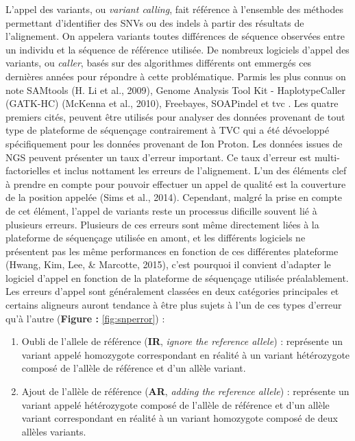 \documentclass[12pt,twoside]{reedthesis}
\providecommand{\tightlist}{%
  \setlength{\itemsep}{0pt}\setlength{\parskip}{0pt}}
\theoremstyle{definition}
\theoremstyle{definition}
\theoremstyle{remark}
\begin{document}
  L'appel des variants, ou \emph{variant calling}, fait référence à
  l'ensemble des méthodes permettant d'identifier des SNVs ou des indels à
  partir des résultats de l'alignement. On appelera variants toutes
  différences de séquence observées entre un individu et la séquence de
  référence utilisée. De nombreux logiciels d'appel des variants, ou
  \emph{caller}, basés sur des algorithmes différents ont emmergés ces
  dernières années pour répondre à cette problématique. Parmis les plus
  connus on note SAMtools (H. Li et al., 2009), Genome Analysis Tool Kit -
  HaplotypeCaller (GATK-HC) (McKenna et al., 2010), Freebayes, SOAPindel
  et tvc . Les quatre premiers cités, peuvent être utilisés pour analyser
  des données provenant de tout type de plateforme de séquençage
  contrairement à TVC qui a été dévoeloppé spécifiquement pour les données
  provenant de Ion Proton. Les données issues de NGS peuvent présenter un
  taux d'erreur important. Ce taux d'erreur est multi-factorielles et
  inclus nottament les erreurs de l'alignement. L'un des éléments clef à
  prendre en compte pour pouvoir effectuer un appel de qualité est la
  couverture de la position appelée (Sims et al., 2014). Cependant, malgré
  la prise en compte de cet élément, l'appel de variants reste un
  processus dificille souvent lié à plusieurs erreurs. Plusieurs de ces
  erreurs sont même directement liées à la plateforme de séquençage
  utilisée en amont, et les différents logiciels ne présentent pas les
  même performances en fonction de ces différentes plateforme (Hwang, Kim,
  Lee, \& Marcotte, 2015), c'est pourquoi il convient d'adapter le
  logiciel d'appel en fonction de la plateforme de séquençage utilisée
  préalablement. Les erreurs d'appel sont généralement classées en deux
  catégories principales et certains aligneurs auront tendance à être plus
  sujets à l'un de ces types d'erreur qu'à l'autre (\textbf{Figure :
  }\ref{fig:snperror}) :
  
  \begin{enumerate}
  \def\labelenumi{\arabic{enumi}.}
  \tightlist
  \item
    Oubli de l'allele de référence (\textbf{IR}, \emph{ignore the
    reference allele}) : représente un variant appelé homozygote
    correspondant en réalité à un variant hétérozygote composé de l'allèle
    de référence et d'un allèle variant.\\
  \item
    Ajout de l'allèle de référence (\textbf{AR}, \emph{adding the
    reference allele}) : représente un variant appelé hétérozygote composé
    de l'allèle de référence et d'un allèle variant correspondant en
    réalité à un variant homozygote composé de deux allèles variants.\\
  \end{enumerate}
  
\end{document}
